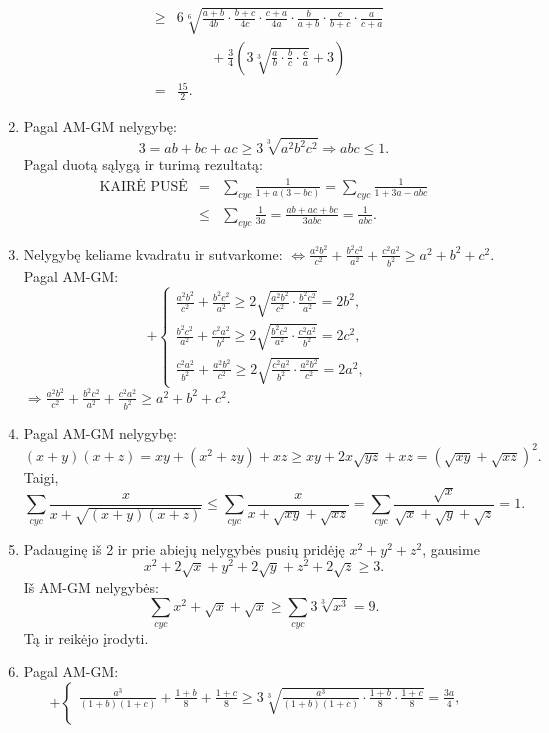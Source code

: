\begin{enumerate}
\begin{eqnarray*}
    &\geq&6\sqrt[6]{\frac{a+b}{4b}\cdot\frac{b+c}{4c}\cdot\frac{c+a}{4a}\cdot\frac{b}{a+b}\cdot\frac{c}{b+c}\cdot\frac{a}{c+a}}\\
    &&\hspace{1cm}+\frac{3}{4}\left(3\sqrt[3]{\frac{a}{b}\cdot\frac{b}{c}\cdot\frac{c}{a}}+3\right)\\
    &=&\frac{15}{2}. \end{eqnarray*}
\item
    Pagal AM-GM nelygybę: $$3=ab+bc+ac\geq3\sqrt[3]{a^2b^2c^2}\Rightarrow
    abc\leq1.$$ Pagal duotą sąlygą ir turimą rezultatą:
    \begin{eqnarray*}\text{KAIRĖ
    PUSĖ}&=&\sum_{cyc}{\frac{1}{1+a(3-bc)}}=\sum_{cyc}{\frac{1}{1+3a-abc}}\\&\leq&\sum_{cyc}{\frac{1}{3a}}=\frac{ab+ac+bc}{3abc}=\frac{1}{abc}.\end{eqnarray*}
\item
    Nelygybę keliame kvadratu ir sutvarkome:
    $\Leftrightarrow\frac{a^2b^2}{c^2}+\frac{b^2c^2}{a^2}+\frac{c^2a^2}{b^2}\geq
    a^2+b^2+c^2.$ Pagal AM-GM: $$+\left\{\begin{array}{ll}
    \frac{a^2b^2}{c^2}+\frac{b^2c^2}{a^2}\geq2\sqrt{\frac{a^2b^2}{c^2}\cdot\frac{b^2c^2}{a^2}}=2b^2,&\\
    \frac{b^2c^2}{a^2}+\frac{c^2a^2}{b^2}\geq2\sqrt{\frac{b^2c^2}{a^2}\cdot\frac{c^2a^2}{b^2}}=2c^2,&\\
    \frac{c^2a^2}{b^2}+\frac{a^2b^2}{c^2}\geq2\sqrt{\frac{c^2a^2}{b^2}\cdot\frac{a^2b^2}{c^2}}=2a^2,&\end{array}\right.
    $$
    $\Rightarrow\frac{a^2b^2}{c^2}+\frac{b^2c^2}{a^2}+\frac{c^2a^2}{b^2}\geq
    a^2+b^2+c^2.$
\item
    Pagal AM-GM nelygybę: $$(x+y)(x+z)=xy+(x^2+zy)+xz\geq
    xy+2x\sqrt{yz}+xz=(\sqrt{xy}+\sqrt{xz})^2.$$ Taigi,
    $$\sum_{cyc}{\frac{x}{x+\sqrt{(x+y)(x+z)}}}\leq\sum_{cyc}{\frac{x}{x+\sqrt{xy}+\sqrt{xz}}}=
    \sum_{cyc}{\frac{\sqrt{x}}{\sqrt{x}+\sqrt{y}+\sqrt{z}}}=1.$$
\item
    Padauginę iš 2 ir prie abiejų nelygybės pusių pridėję $x^2+y^2+z^2$,
    gausime $$x^2+2\sqrt{x}+y^2+2\sqrt{y}+z^2+2\sqrt{z}\geq3.$$ Iš AM-GM
    nelygybės:
    $$\sum_{cyc}{x^2+\sqrt{x}+\sqrt{x}}\geq\sum_{cyc}{3\sqrt[3]{x^3}}=9.$$
    Tą ir reikėjo įrodyti.
\item
    Pagal AM-GM: $$+\left\{\begin{array}{ll}
    \frac{a^3}{(1+b)(1+c)}+\frac{1+b}{8}+\frac{1+c}{8}\geq3\sqrt[3]{\frac{a^3}{(1+b)(1+c)}\cdot\frac{1+b}{8}\cdot\frac{1+c}{8}}=\frac{3a}{4},&\\

\end{array}$$
\end{enumerate}

